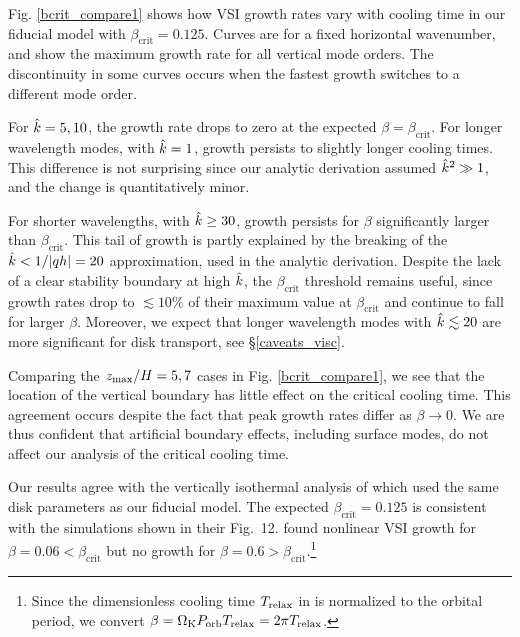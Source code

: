 Fig. \ref{bcrit_compare1} shows how VSI growth rates vary with cooling time 
in our fiducial model with $\beta_\mathrm{crit} = 0.125$.  
Curves are for a fixed horizontal wavenumber, and show the maximum growth rate for all vertical mode orders.  The 
discontinuity in some curves occurs when the fastest growth switches to a different mode order.

For $\hat{k} = 5, 10$, the growth rate drops to zero at the expected $\beta = \beta_\mathrm{crit}$.
For longer wavelength modes, with $\hat{k} = 1$, growth persists to slightly longer cooling times.  
This difference is not surprising since our analytic derivation assumed $\hat{k}^2 \gg1$, and 
the change is quantitatively minor.

For shorter wavelengths, with $\hat{k} \geq 30$, growth persists for $\beta$ significantly larger
than $\beta_\mathrm{crit}$.  This tail of growth is partly explained by the breaking of the $\hat{k} < 1/|qh| = 20$ 
approximation, used in  the analytic derivation.  Despite the lack of a clear stability boundary 
at high $\hat{k}$, the $\beta_\mathrm{crit}$ threshold remains useful, since growth rates drop to 
$\lesssim 10\%$ of  their maximum value at  $\beta_\mathrm{crit}$ and continue to fall for larger $\beta$. 
 Moreover, we expect that longer wavelength modes with $\hat{k} \lesssim 20$
are more significant for disk transport, see \S\ref{caveats_visc}.

Comparing the $z_\mathrm{max}/H = 5, 7$ cases in Fig. \ref{bcrit_compare1}, we see that the location of the vertical
boundary has little effect on the critical cooling time.  This agreement occurs despite the fact that peak growth rates
differ as $\beta \to 0$.  We are thus confident that artificial boundary effects, including surface modes, do not
affect our analysis of the critical cooling time.

Our results agree with the vertically isothermal analysis of  
which used the same disk parameters as our fiducial model.  The expected $\beta_\mathrm{crit} = 0.125$ 
is consistent with the simulations shown in their Fig.\ 12.    
found nonlinear VSI growth for $\beta = 0.06< \beta_\mathrm{crit}$ but no growth for 
  $\beta = 0.6 > \beta_\mathrm{crit}$.\footnote{Since the dimensionless cooling time $T_{\rm relax}$ in 
  is normalized to the orbital period, we convert $\beta = \Omega_{\rm K} P_{\rm orb} T_{\rm relax} = 2 \pi T_{\rm relax}$.}


